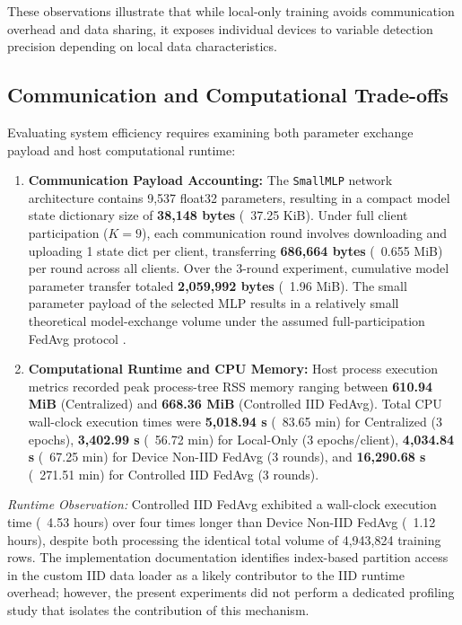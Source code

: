 \documentclass[11pt,a4paper]{article}
\begin{document}
These observations illustrate that while local-only training avoids communication overhead and data sharing, it exposes individual devices to variable detection precision depending on local data characteristics.

\subsection{Communication and Computational Trade-offs}
Evaluating system efficiency requires examining both parameter exchange payload and host computational runtime:

\begin{enumerate}
    \item \textbf{Communication Payload Accounting:} The \texttt{SmallMLP} network architecture contains 9,537 float32 parameters, resulting in a compact model state dictionary size of \textbf{38,148 bytes} (~37.25 KiB). Under full client participation ($K = 9$), each communication round involves downloading and uploading 1 state dict per client, transferring \textbf{686,664 bytes} (~0.655 MiB) per round across all clients. Over the 3-round experiment, cumulative model parameter transfer totaled \textbf{2,059,992 bytes} (~1.96 MiB). The small parameter payload of the selected MLP results in a relatively small theoretical model-exchange volume under the assumed full-participation FedAvg protocol \cite{ref1, ref6}.
    \item \textbf{Computational Runtime and CPU Memory:} Host process execution metrics recorded peak process-tree RSS memory ranging between \textbf{610.94 MiB} (Centralized) and \textbf{668.36 MiB} (Controlled IID FedAvg). Total CPU wall-clock execution times were \textbf{5,018.94 s} (~83.65 min) for Centralized (3 epochs), \textbf{3,402.99 s} (~56.72 min) for Local-Only (3 epochs/client), \textbf{4,034.84 s} (~67.25 min) for Device Non-IID FedAvg (3 rounds), and \textbf{16,290.68 s} (~271.51 min) for Controlled IID FedAvg (3 rounds).
\end{enumerate}

\textit{Runtime Observation:} Controlled IID FedAvg exhibited a wall-clock execution time (~4.53 hours) over four times longer than Device Non-IID FedAvg (~1.12 hours), despite both processing the identical total volume of 4,943,824 training rows. The implementation documentation identifies index-based partition access in the custom IID data loader as a likely contributor to the IID runtime overhead; however, the present experiments did not perform a dedicated profiling study that isolates the contribution of this mechanism.
\end{document}
